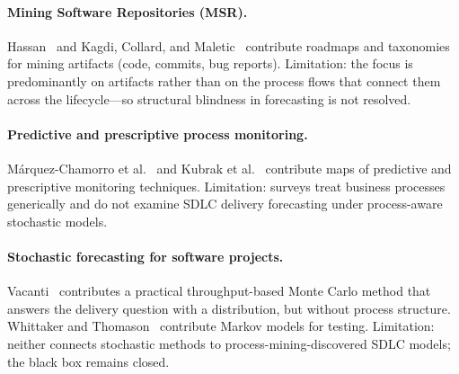 \paragraph{Mining Software Repositories (MSR).}
Hassan~\cite{hassan2008road} and Kagdi, Collard, and
Maletic~\cite{kagdi2007} contribute roadmaps and taxonomies for mining
artifacts (code, commits, bug reports).
Limitation: the focus is predominantly on artifacts rather than on the
process flows that connect them across the lifecycle---so structural
blindness in forecasting is not resolved.

\paragraph{Predictive and prescriptive process monitoring.}
Márquez-Chamorro et al.~\cite{marquezChamorro2018} and Kubrak et
al.~\cite{kubrak2022} contribute maps of predictive and prescriptive
monitoring techniques.
Limitation: surveys treat business processes generically and do not
examine SDLC delivery forecasting under process-aware stochastic models.

\paragraph{Stochastic forecasting for software projects.}
Vacanti~\cite{vacanti2015} contributes a practical throughput-based Monte
Carlo method that answers the delivery question with a distribution, but
without process structure.
Whittaker and Thomason~\cite{whittaker1994} contribute Markov models for
testing.
Limitation: neither connects stochastic methods to
process-mining-discovered SDLC models; the black box remains closed.

